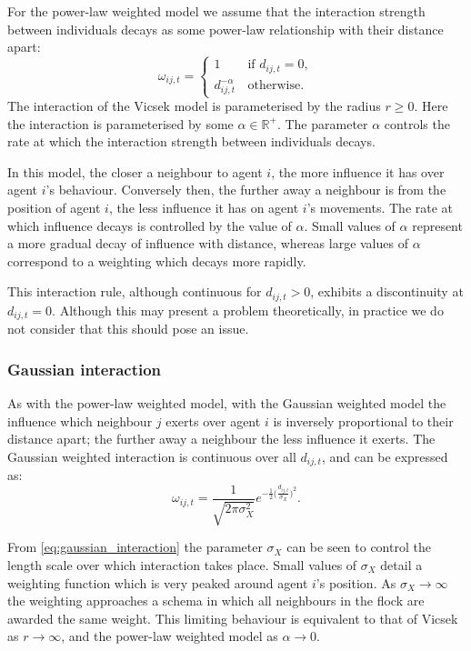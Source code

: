 For the power-law weighted model we assume that the interaction strength between
individuals decays as some power-law relationship with their distance apart:
\begin{equation}
    \label{eq:power_law_interaction}
	\omega_{ij,t} =
	\begin{cases}
		1                  & \, \text{if } d_{ij,t} = 0, \\
		d_{ij,t}^{-\alpha} & \, \text{otherwise}.
	\end{cases}
\end{equation}
The interaction of the Vicsek model is parameterised by the radius $r \geq 0$. Here the
interaction is parameterised by some $\alpha\in\mathbb{R}^+$. The parameter $\alpha$
controls the rate at which the interaction strength between individuals decays. 

In this model, the closer a neighbour to agent $i$, the more influence it has over agent
$i$'s behaviour. Conversely then, the further away a neighbour is from the position of
agent $i$, the less influence it has on agent $i$'s movements. The rate at which influence
decays is controlled by the value of $\alpha$. Small values of $\alpha$ represent a more
gradual decay of influence with distance, whereas large values of $\alpha$ correspond to a
weighting which decays more rapidly.

This interaction rule, although continuous for $d_{ij,t} > 0$, exhibits a discontinuity at
$d_{ij,t}=0$. Although this may present a problem theoretically, in practice we do not
consider that this should pose an issue.

\subsubsection{Gaussian interaction}

As with the power-law weighted model, with the Gaussian weighted model the influence which
neighbour $j$ exerts over agent $i$ is inversely proportional to their distance apart; the
further away a neighbour the less influence it exerts. The Gaussian weighted interaction
is continuous over all $d_{ij,t}$, and can be expressed as:
\begin{equation}
    \label{eq:gaussian_interaction}
	\omega_{ij,t} =
	\frac{1}{\sqrt{2\pi\sigma_X^2}}
	e^{-\frac{1}{2}\big(\frac{d_{ij,t}}{\sigma_X}\big)^2}.
\end{equation}

From \cref{eq:gaussian_interaction} the parameter $\sigma_X$ can be seen to control the
length scale over which interaction takes place. Small values of $\sigma_X$ detail a
weighting function which is very peaked around agent $i$'s position. As $\sigma_X
\rightarrow \infty$ the weighting approaches a schema in which all neighbours in the flock
are awarded the same weight. This limiting behaviour is equivalent to that of Vicsek as
$r\rightarrow\infty$, and the power-law weighted model as $\alpha\rightarrow0$.

